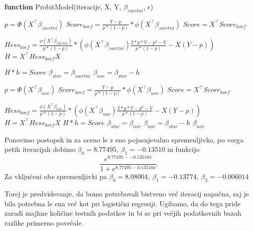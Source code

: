 \documentclass[12pt,a4paper]{amsart}
\theoremstyle{definition} %
\theoremstyle{plain} %
\begin{document}
\begin{algorithm}[H]
    \caption{\textbf{function} ProbitModel(iteracije, X, Y, $\beta_{zacetni}$, $\epsilon$)}
\begin{algorithmic}

    \STATE $p = \Phi(X^\top \beta_{zacetni})$
    \STATE $Score_{koef} = \frac{Y-p}{p*(1-p)} * \phi(X^\top \beta_{zacetni})$
    \STATE $Score = X^\top Score_{koef}$

    \STATE $Hess_{koef} = \frac{\phi(X^\top \beta_{zacetni})}{p*(1-p)} * \left(\phi(X^\top \beta_{zacetni})\frac{2*p*Y - p^2-Y}{p*(1-p)} - X(Y - p)\right)$
    \STATE $H = X^\top Hess_{koef} X$
        
    \STATE {} $H * h = Score$
    \STATE $\beta_{star} = \beta_{zacetni}$
    \STATE $\beta_{nov} = \beta_{star} - h$
        
            \STATE $p = \Phi(X^\top \beta_{nov})$
            \STATE $Score_{koef} = \frac{Y-p}{p*(1-p)} * \phi(X^\top \beta_{nov})$
            \STATE $Score = X^\top Score_{koef}$
            
            \STATE $Hess_{koef} = \frac{\phi(X^\top \beta_{nov})}{p*(1-p)} * \left(\phi(X^\top \beta_{nov})\frac{2*p*Y - p^2-Y}{p*(1-p)} - X(Y - p)\right)$
            \STATE $H = X^\top Hess_{koef} X$
            \STATE {}
            \STATE $H * h = Score$ 
            \STATE $\beta_{star} = \beta_{nov}$ 
            \STATE $\beta_{nov} = \beta_{star} - h$ 
        \ELSE
        \STATE {}
        \RETURN $\beta_{nov}$
        \ENDIF
        
    \ENDWHILE
\end{algorithmic}
\end{algorithm}
Ponovimo postopek in za oceno le z eno pojasnjevalno spremenljivko, po vsega petih iteracijah dobimo $\beta_{0} = 8.77495,~\beta_{1} = -0.13510$ in funkcijo
\[
    \frac{e^{8.77495--0.13510x}}{1+e^{8.77495-0.13510x}}.
\]
Za vključeni obe spremenljivki pa $\beta_{0} = 8.08004,~\beta_{1} = -0.13774,~\beta_{2} = -0.006014$

Torej je predvidevanje, da bomo potrebovali bistveno več iteracij napačna, saj je bila potrebna le ena več kot pri logistični regresiji. Ugibamo, da do tega pride zaradi
majhne količine testnih podatkov in bi se pri večjih podatkovnih bazah razlike primerno povečale.
\end{document}

